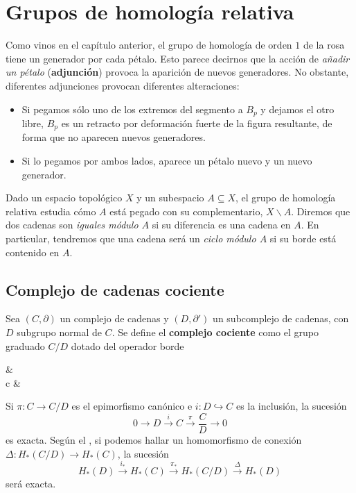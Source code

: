 \setchapterpreamble[u]{\margintoc}

\chapter{Grupos de homología relativa}
Como vinos en el capítulo anterior, el grupo de homología de orden $1$ de la
rosa tiene un generador por cada pétalo. Esto parece decirnos que la acción
de \emph{añadir un pétalo} (\textbf{adjunción}) provoca la aparición de
nuevos generadores. No obstante, diferentes adjunciones provocan diferentes
alteraciones:

\begin{itemize}
\item Si pegamos sólo uno de los extremos del segmento a $B_p$ y dejamos el
otro libre, $B_p$ es un retracto por deformación fuerte de la figura
resultante, de forma que no aparecen nuevos generadores.
\item Si lo pegamos por ambos lados, aparece un pétalo nuevo y un nuevo
generador.
\end{itemize}

Dado un espacio topológico $X$ y un subespacio $A \subseteq X$, el grupo de
homología relativa estudia cómo $A$ está pegado con su complementario,
$X\backslash A$. Diremos que dos cadenas son \textit{iguales módulo $A$} si
su diferencia es una cadena en $A$. En particular, tendremos que una cadena
será un \textit{ciclo módulo $A$} si su borde está contenido en $A$.

\section{Complejo de cadenas cociente}
\begin{definition}
Sea $(C,\partial)$ un complejo de cadenas y $(D,\partial')$ un subcomplejo de
cadenas, con $D$ subgrupo normal de $C$. Se define el \textbf{complejo
cociente} como el grupo graduado $C/D$ dotado del operador borde
\begin{diag}
 \arrow[r]& \\[-8mm]
\overline c \arrow[r, maps to] & 
\end{diag}
\end{definition}

Si $\pi\colon C \to C/D$ es el epimorfismo canónico e $i\colon D
\hookrightarrow C$ es la inclusión, la sucesión
\[0 \longrightarrow D \xrightarrow{i} C \xrightarrow{\pi} \frac{C}{D}
\longrightarrow 0\]
es exacta. Según el , si podemos hallar un
homomorfismo de conexión $\Delta\colon H_*(C/D) \to H_*(C)$, la sucesión
\begin{equation}
\label{SECociente}
H_*(D) \xrightarrow{i_*} H_*(C) \xrightarrow{\pi_*}
H_*(C/D) \xrightarrow{\Delta} H_*(D)
\end{equation}
será exacta.

